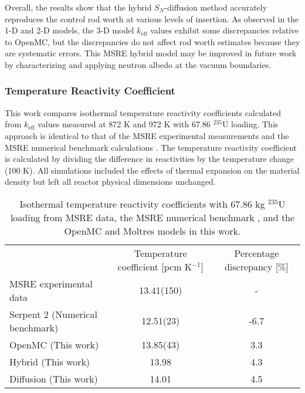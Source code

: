 Overall, the results show that the hybrid $S_N$-diffusion method accurately reproduces the control
rod worth at various levels of insertion. As observed in the 1-D and 2-D models, the 3-D model
$k_\text{eff}$ values exhibit some discrepancies relative to OpenMC, but the discrepancies do not
affect rod worth estimates because they are systematic errors. This \gls{MSRE} hybrid model may be
improved in future work by characterizing and applying neutron albedo at the vacuum boundaries.

\subsubsection{Temperature Reactivity Coefficient} \label{sec:temp-coef}

This work compares isothermal temperature reactivity coefficients calculated from $k_\text{eff}$
values measured at 872 K and 972 K with 67.86 $^{235}$U loading. This approach is identical to that
of the \gls{MSRE} experimental measurements \cite{prince_zero-power_1968} and the \gls{MSRE}
numerical benchmark calculations \cite{fratoni_molten_2020}. The temperature reactivity coefficient
is calculated by dividing the difference in reactivities by the temperature change (100 K). All
simulations included the effects of thermal expansion on the material density but left all reactor
physical dimensions unchanged.

\begin{table}[h]
  \small
  \centering
  \caption{Isothermal temperature reactivity coefficients with 67.86 kg $^{235}$U loading from
  \gls{MSRE} data, the \gls{MSRE} numerical benchmark \cite{fratoni_molten_2020}, and the OpenMC
  and Moltres models in this work.}
  \begin{tabular}{l S[separate-uncertainty=true,table-format=2.2(2)] S}
    \toprule
     & {Temperature coefficient [pcm K$^{-1}$]} & {Percentage discrepancy [\%]}\\
     \cmidrule(rl){2-2} \cmidrule(l){3-3}
    \gls{MSRE} experimental data & 13.41(150) & {-}\\
    Serpent 2 (Numerical benchmark) & 12.51(23) & -6.7 \\
    OpenMC (This work) & 13.85(43) & 3.3 \\
    Hybrid (This work) & 13.98 & 4.3 \\
    Diffusion (This work) & 14.01 & 4.5 \\
    \bottomrule
  \end{tabular}
  \label{table:temp-coef}
\end{table}

